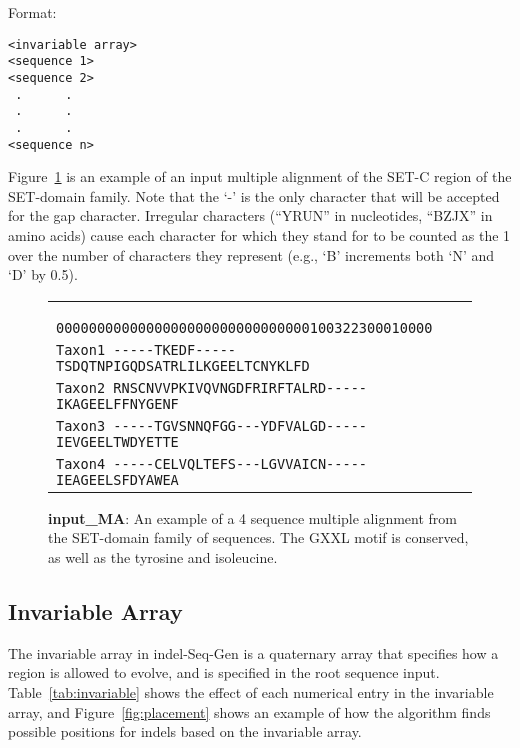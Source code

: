 \documentclass[10pt]{article}
\begin{document}
Format:
\begin{verbatim}
<invariable array>
<sequence 1>
<sequence 2>
 .      .
 .      . 
 .      .
<sequence n>
\end{verbatim}

Figure~\ref{fig:input_MA} is an example of an input multiple alignment of the SET-C region of 
the SET-domain family. Note that the `-' is the only character that will be accepted for the
gap character. Irregular characters (``YRUN'' in nucleotides, ``BZJX'' in amino acids) cause each
character for which they stand for to be counted as the 1 over the number of characters they
represent (e.g., `B' increments both `N' and `D' by 0.5).

\begin{figure}[Htbp]
\centering
\begin{tabular}{l}
\verb+       0000000000000000000000000000000100322300010000+\\
\verb+Taxon1 -----TKEDF-----TSDQTNPIGQDSATRLILKGEELTCNYKLFD+\\
\verb+Taxon2 RNSCNVVPKIVQVNGDFRIRFTALRD-----IKAGEELFFNYGENF+\\
\verb+Taxon3 -----TGVSNNQFGG---YDFVALGD-----IEVGEELTWDYETTE+\\
\verb+Taxon4 -----CELVQLTEFS---LGVVAICN-----IEAGEELSFDYAWEA+\\
\end{tabular}
\caption{{\bf input\_MA}: An example of a 4 sequence multiple alignment from the 
SET-domain family of sequences.  The GXXL motif is conserved, as well as the tyrosine and 
isoleucine.}
\label{fig:input_MA}
\end{figure}

\subsection{Invariable Array}

The invariable array in indel-Seq-Gen is a quaternary array that specifies how a region is 
allowed to evolve, and is specified in the root sequence input.  Table~\ref{tab:invariable} 
shows the effect of each numerical entry in the invariable array, and 
Figure~\ref{fig:placement} shows an example of how the algorithm finds possible positions for 
indels based on the invariable array.
\end{document}
